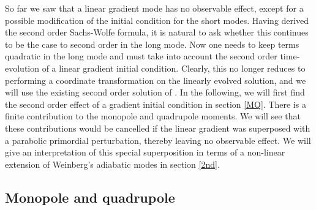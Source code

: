 \documentclass[12pt]{article}
\numberwithin{equation}{section}
\begin{document}
So far we saw that a linear gradient mode has no observable effect, except for a possible modification of the initial condition for the short modes. Having derived the second order Sachs-Wolfe formula, it is natural to ask whether this continues to be the case to second order in the long mode. Now one needs to keep terms quadratic in the long mode and must take into account the second order time-evolution of a linear gradient initial condition. Clearly, this no longer reduces to performing a coordinate transformation on the linearly evolved solution, and we will use the existing second order solution of \cite{Matarrese,Bartolo,Creminelli_action}. In the following, we will first find the second order effect of a gradient initial condition in section \ref{MQ}. There is a finite contribution to the monopole and quadrupole moments. We will see that these contributions would be cancelled if the linear gradient was superposed with a parabolic primordial perturbation, thereby leaving no observable effect. We will give an interpretation of this special superposition in terms of a non-linear extension of Weinberg's adiabatic modes in section \ref{2nd}.

\subsection{Monopole and quadrupole\label{MQ}}
\end{document}
